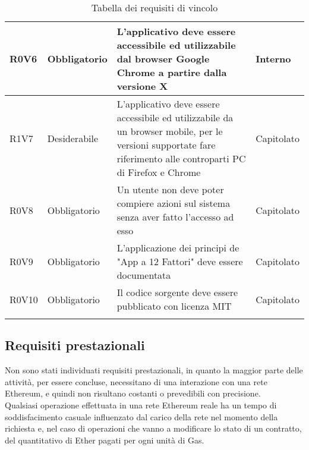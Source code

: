 \documentclass[AnalisiDeiRequisiti.tex]{subfiles}
\begin{document}
\begin{longtable}[H]{|p{2.5cm}|p{2.5cm}|p{5cm}|p{2cm}|}
	R0V6 & Obbligatorio & L'applicativo deve essere accessibile ed utilizzabile dal browser Google Chrome a partire dalla versione X & Interno \\ \hline %
	R1V7 & Desiderabile & L'applicativo deve essere accessibile ed utilizzabile da un browser mobile, per le versioni supportate fare riferimento alle controparti PC di Firefox e Chrome & Capitolato \\ \hline
	R0V8 & Obbligatorio & Un utente non deve poter compiere azioni sul sistema senza aver fatto l'accesso ad esso & Capitolato \\ \hline
	R0V9 & Obbligatorio & L'applicazione dei principi de "App a 12 Fattori" deve essere documentata & Capitolato \\ \hline
	R0V10 & Obbligatorio & Il codice sorgente deve essere pubblicato con licenza MIT & Capitolato \\ \hline
	\caption{Tabella dei requisiti di vincolo}
\end{longtable}

\subsection{Requisiti prestazionali}

Non sono stati individuati requisiti prestazionali, in quanto la maggior parte delle attività, per essere concluse, necessitano di una interazione con una rete Ethereum, e quindi non risultano costanti o prevedibili con precisione.\\
Qualsiasi operazione effettuata in una rete Ethereum reale ha un tempo di soddisfacimento casuale influenzato dal carico della rete nel momento della richiesta e, nel caso di operazioni che vanno a modificare lo stato di un contratto, del quantitativo di Ether pagati per ogni unità di Gas.\\
 
\begin{comment}
\label{table:Tabella requisiti prestazionali}
\begin{longtable}[H]{|p{2.5cm}|p{2.5cm}|p{5cm}|p{2cm}|}
	\hline
	\rowcolor[HTML]{38FFF8} 
	\textbf{Identificatore} & \textbf{Importanza} & \textbf{Descrizione} & \textbf{Fonti} \\ \hline
	\endhead
	&  &  &  \\ \hline
	&  &  &  \\ \hline
	&  &  &  \\ \hline
	&  &  &  \\ \hline
	&  &  &  \\ \hline
	\caption{Tabella dei requisiti prestazionali}
\end{longtable}
\end{comment}
\end{document}
